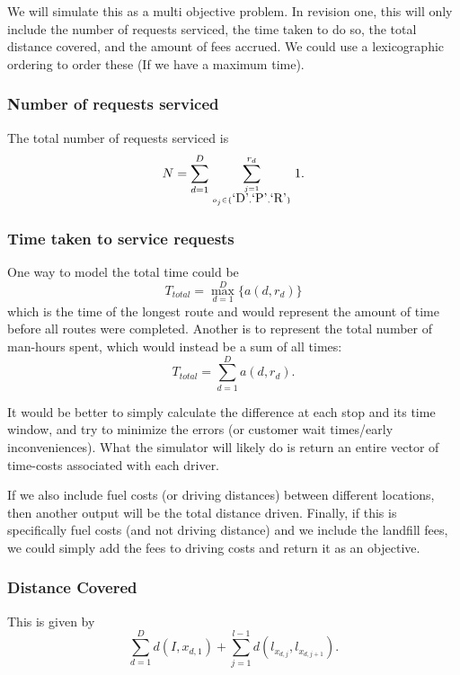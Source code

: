 \documentclass{article}
\begin{document}
We will simulate this as a multi objective problem.
In revision one, this will only include the number of requests serviced, the time taken to do so, the total distance covered, and the amount of fees accrued.
We could use a lexicographic ordering to order these (If we have a maximum time).

\subsubsection{Number of requests serviced}

The total number of requests serviced is 
$$N = \sum_{d=1} ^D \sum_{j=1\atop o_j \in \{\mbox{`D'},\mbox{`P'}, \mbox{`R'}\}}^{r_d} 1.$$

\subsubsection{Time taken to service requests}

One way to model the total time could be
$$ T_{total} = \max_{d=1} ^D \{ a(d, r_d) \} $$ which is the time of the longest route and would represent the amount of time before all routes were completed.
Another is to represent the total number of man-hours spent, which would instead be a sum of all times:
$$ T_{total} = \sum_{d=1} ^D  a(d, r_d)  .$$

It would be better to simply calculate the difference at each stop and its time window, 
and try to minimize the errors (or customer wait times/early inconveniences).
What the simulator will likely do is return an entire vector of time-costs associated with each driver.

If we also include fuel costs (or driving distances) between different locations, then another output will be the total distance driven.
Finally, if this is specifically fuel costs (and not driving distance) and we include the landfill fees, we could simply add the fees to driving costs and return it as an objective.

\subsubsection{Distance Covered}
This is given by
$$\sum_{d=1}^D d(I, x_{d, 1}) + \sum_{j=1}^{l-1} d(l_{x_{d,j}},l_{x_{d,j+1}} ).$$
\end{document}
